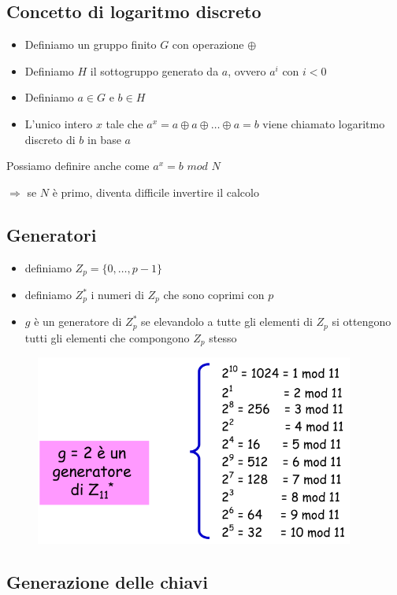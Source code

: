 \subsection{Concetto di logaritmo discreto}

\begin{itemize}
    \item Definiamo un gruppo finito $G$ con operazione $\oplus$
    \item Definiamo $H$ il sottogruppo generato da $a$, ovvero $a^i$ con $i < 0$
    \item Definiamo $a \in G$ e $b \in H$
    \item L'unico intero $x$ tale che $a^x = a \oplus a \oplus \dots \oplus a = b$ viene chiamato 
    logaritmo discreto di $b$ in base $a$
\end{itemize}

\noindent Possiamo definire anche come $a^x = b$ $mod$ $N$

$\Rightarrow$ se $N$ è primo, diventa difficile invertire il calcolo

\subsection{Generatori}

\begin{itemize}
    \item definiamo $Z_p=\{0, \dots , p-1\}$
    \item definiamo $Z_p^*$ i numeri di $Z_p$ che sono coprimi con $p$
    \item $g$ è un generatore di $Z_p^*$ se elevandolo a tutte gli elementi di $Z_p$
    si ottengono tutti gli elementi che compongono $Z_p$ stesso
\end{itemize}

\begin{figure}[H]
    \centering
    \includegraphics[width=0.6\linewidth]{chapters/chap04/images/generatore.png}
\end{figure}

\subsection{Generazione delle chiavi}

